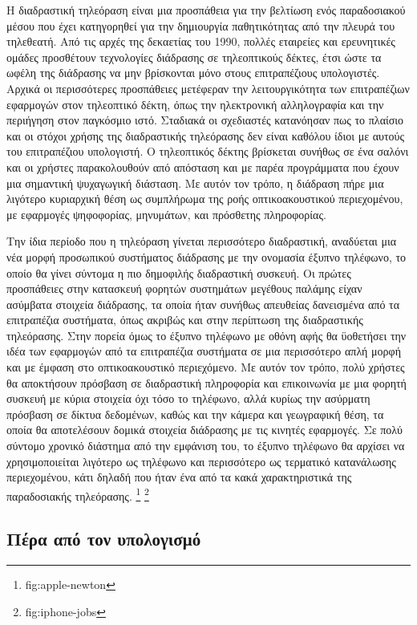 \documentclass[
]{article}
\begin{document}
Η διαδραστική τηλεόραση είναι μια προσπάθεια για την βελτίωση ενός
παραδοσιακού μέσου που έχει κατηγορηθεί για την δημιουργία παθητικότητας
από την πλευρά του τηλεθεατή. Από τις αρχές της δεκαετίας του 1990,
πολλές εταιρείες και ερευνητικές ομάδες προσθέτουν τεχνολογίες διάδρασης
σε τηλεοπτικούς δέκτες, έτσι ώστε τα ωφέλη της διάδρασης να μην
βρίσκονται μόνο στους επιτραπέζιους υπολογιστές. Αρχικά οι περισσότερες
προσπάθειες μετέφεραν την λειτουργικότητα των επιτραπέζιων εφαρμογών
στον τηλεοπτικό δέκτη, όπως την ηλεκτρονική αλληλογραφία και την
περιήγηση στον παγκόσμιο ιστό. Σταδιακά οι σχεδιαστές κατανόησαν πως το
πλαίσιο και οι στόχοι χρήσης της διαδραστικής τηλεόρασης δεν είναι
καθόλου ίδιοι με αυτούς του επιτραπέζιου υπολογιστή. Ο τηλεοπτικός
δέκτης βρίσκεται συνήθως σε ένα σαλόνι και οι χρήστες παρακολουθούν από
απόσταση και με παρέα προγράμματα που έχουν μια σημαντική ψυχαγωγική
διάσταση. Με αυτόν τον τρόπο, η διάδραση πήρε μια λιγότερο κυριαρχική
θέση ως συμπλήρωμα της ροής οπτικοακουστικού περιεχομένου, με εφαρμογές
ψηφοφορίας, μηνυμάτων, και πρόσθετης πληροφορίας.

Την ίδια περίοδο που η τηλεόραση γίνεται περισσότερο διαδραστική,
αναδύεται μια νέα μορφή προσωπικού συστήματος διάδρασης με την ονομασία
έξυπνο τηλέφωνο, το οποίο θα γίνει σύντομα η πιο δημοφιλής διαδραστική
συσκευή. Οι πρώτες προσπάθειες στην κατασκευή φορητών συστημάτων
μεγέθους παλάμης είχαν ασύμβατα στοιχεία διάδρασης, τα οποία ήταν
συνήθως απευθείας δανεισμένα από τα επιτραπέζια συστήματα, όπως ακριβώς
και στην περίπτωση της διαδραστικής τηλεόρασης. Στην πορεία όμως το
έξυπνο τηλέφωνο με οθόνη αφής θα ϋοθετήσει την ιδέα των εφαρμογών από τα
επιτραπέζια συστήματα σε μια περισσότερο απλή μορφή και με έμφαση στο
οπτικοακουστικό περιεχόμενο. Με αυτόν τον τρόπο, πολύ χρήστες θα
αποκτήσουν πρόσβαση σε διαδραστική πληροφορία και επικοινωνία με μια
φορητή συσκευή με κύρια στοιχεία όχι τόσο το τηλέφωνο, αλλά κυρίως την
ασύρματη πρόσβαση σε δίκτυα δεδομένων, καθώς και την κάμερα και
γεωγραφική θέση, τα οποία θα αποτελέσουν δομικά στοιχεία διάδρασης με
τις κινητές εφαρμογές. Σε πολύ σύντομο χρονικό διάστημα από την εμφάνιση
του, το έξυπνο τηλέφωνο θα αρχίσει να χρησιμοποιείται λιγότερο ως
τηλέφωνο και περισσότερο ως τερματικό κατανάλωσης περιεχομένου, κάτι
δηλαδή που ήταν ένα από τα κακά χαρακτηριστικά της παραδοσιακής
τηλεόρασης. \footnote{fig:apple-newton} \footnote{fig:iphone-jobs}

\hypertarget{ux3c0ux3adux3c1ux3b1-ux3b1ux3c0ux3cc-ux3c4ux3bfux3bd-ux3c5ux3c0ux3bfux3bbux3bfux3b3ux3b9ux3c3ux3bcux3cc}{%
\subsection{Πέρα από τον
υπολογισμό}\label{ux3c0ux3adux3c1ux3b1-ux3b1ux3c0ux3cc-ux3c4ux3bfux3bd-ux3c5ux3c0ux3bfux3bbux3bfux3b3ux3b9ux3c3ux3bcux3cc}}
\end{document}
